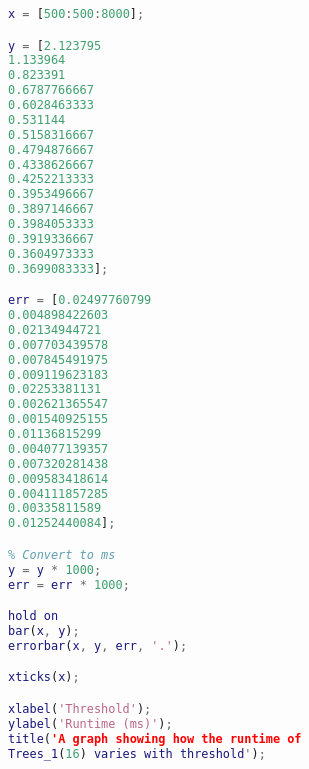 \documentclass[12pt,a4paper,twoside,openright]{report}
\begin{document}
\begin{figure*}
\begin{lstlisting}[language=Matlab, caption=Matlab script for Trees runtime graph w.r.t.~threshold, label={lst:treesbenchthresh}]
x = [500:500:8000];

y = [2.123795
1.133964
0.823391
0.6787766667
0.6028463333
0.531144
0.5158316667
0.4794876667
0.4338626667
0.4252213333
0.3953496667
0.3897146667
0.3984053333
0.3919336667
0.3604973333
0.3699083333];

err = [0.02497760799
0.004898422603
0.02134944721
0.007703439578
0.007845491975
0.009119623183
0.02253381131
0.002621365547
0.001540925155
0.01136815299
0.004077139357
0.007320281438
0.009583418614
0.004111857285
0.00335811589
0.01252440084];

% Convert to ms
y = y * 1000;
err = err * 1000;

hold on
bar(x, y);
errorbar(x, y, err, '.');

xticks(x);

xlabel('Threshold');
ylabel('Runtime (ms)');
title('A graph showing how the runtime of 
Trees_1(16) varies with threshold');
\end{lstlisting}
\end{figure*}
\end{document}

